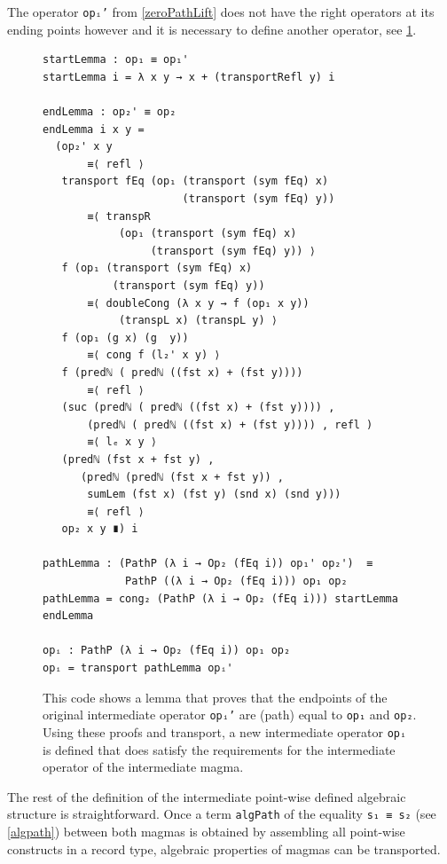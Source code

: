 \documentclass[12pt,a4paper,twoside,xetex]{book}
\begin{document}
The operator \texttt{opᵢ'} from \cref{zeroPathLift} does not have the right 
operators at its ending points however and it is necessary to define another 
operator, see \cref{adaptedOp}.

\begin{figure}\label{adaptedOp}
 \centering
\begin{BVerbatim}
startLemma : op₁ ≡ op₁'
startLemma i = λ x y → x + (transportRefl y) i

endLemma : op₂' ≡ op₂
endLemma i x y =
  (op₂' x y
       ≡⟨ refl ⟩
   transport fEq (op₁ (transport (sym fEq) x) 
                      (transport (sym fEq) y))
       ≡⟨ transpR 
            (op₁ (transport (sym fEq) x) 
                 (transport (sym fEq) y)) ⟩
   f (op₁ (transport (sym fEq) x) 
           (transport (sym fEq) y))
       ≡⟨ doubleCong (λ x y → f (op₁ x y)) 
            (transpL x) (transpL y) ⟩
   f (op₁ (g x) (g  y))
       ≡⟨ cong f (l₂' x y) ⟩
   f (predℕ ( predℕ ((fst x) + (fst y))))
       ≡⟨ refl ⟩
   (suc (predℕ ( predℕ ((fst x) + (fst y)))) , 
       (predℕ ( predℕ ((fst x) + (fst y)))) , refl )
       ≡⟨ lₑ x y ⟩
   (predℕ (fst x + fst y) , 
      (predℕ (predℕ (fst x + fst y)) , 
       sumLem (fst x) (fst y) (snd x) (snd y)))
       ≡⟨ refl ⟩
   op₂ x y ∎) i

pathLemma : (PathP (λ i → Op₂ (fEq i)) op₁' op₂')  ≡  
             PathP ((λ i → Op₂ (fEq i))) op₁ op₂
pathLemma = cong₂ (PathP (λ i → Op₂ (fEq i))) startLemma endLemma

opᵢ : PathP (λ i → Op₂ (fEq i)) op₁ op₂
opᵢ = transport pathLemma opᵢ'
\end{BVerbatim}

\caption{This code shows a lemma that proves that the endpoints of the original 
intermediate operator \texttt{opᵢ'} are (path) equal to \texttt{op₁} and 
\texttt{op₂}. Using these proofs and transport, a new intermediate operator 
\texttt{opᵢ} is defined that does satisfy the requirements for the 
intermediate operator of the intermediate magma.}   
\end{figure}

The rest of the definition of the intermediate point-wise defined algebraic 
structure is straightforward. Once a term \texttt{algPath} of the equality 
\texttt{s₁ ≡ s₂} (see \cref{algpath}) between both magmas is obtained by 
assembling all point-wise constructs in a record type, algebraic properties of 
magmas can be transported.  
\end{document}

